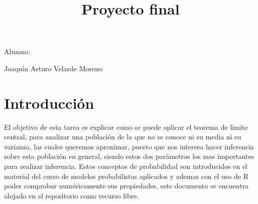 \documentclass[]{article}
\title{Proyecto final}
\date{}
\begin{document}
	\maketitle
	\begin{center}


\textbf{ }

\centerline{Alumno: } 
\centerline{Joaquín Arturo Velarde Moreno}


	\end{center}
	
\section{Introducción}

El objetivo de esta tarea es explicar como se puede aplicar el teorema de limite central, para analizar una población de la que no se conoce ni su media ni su varianza, las cuales queremos aproximar, puesto que nos interesa hacer inferencia sobre esta población en general, siendo estos dos parámetros los mas importantes para realizar inferencia. Estos conceptos de probabilidad son introducidos en el material del curso de modelos probabilistas aplicados\cite{MaterialClase} y ademas con el uso de R poder comprobar numéricamente sus propiedades\cite{rproject}, este documento se encuentra alojado en el repositorio\cite{repositorio} como recurso libre.


\printbibliography[title={Referencias}]
\end{document}
